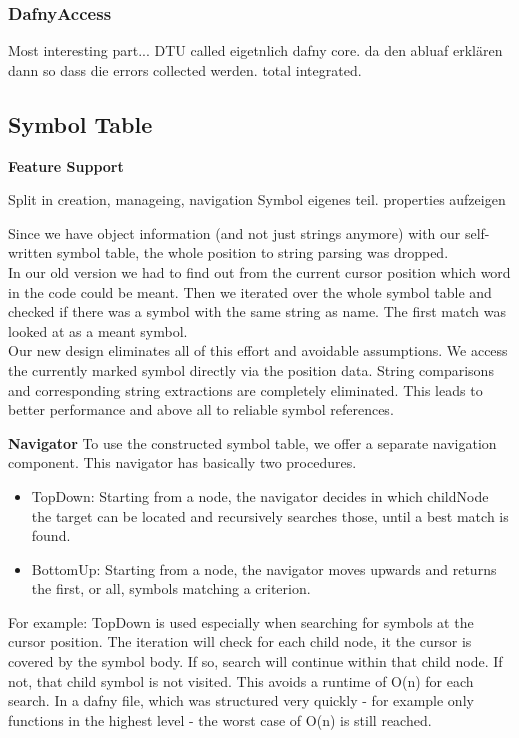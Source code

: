 \subsubsection{DafnyAccess}
Most interesting part...
DTU called eigetnlich dafny core.
da den abluaf erklären
dann so dass die errors collected werden.
total integrated.

\subsection{Symbol Table}



\textbf{Feature Support}

Split in creation, manageing, navigation
Symbol eigenes teil.
properties aufzeigen


Since we have object information (and not just strings anymore) with our self-written symbol table,
the whole position to string parsing was dropped. \\

In our old version we had to find out from the current cursor position which word in the code could be meant.
Then we iterated over the whole symbol table and checked if there was a symbol with the same string as name.
The first match was looked at as a meant symbol. \\

Our new design eliminates all of this effort and avoidable assumptions.
We access the currently marked symbol directly via the position data.
String comparisons and corresponding string extractions are completely eliminated.
This leads to better performance and above all to reliable symbol references.


\textbf{Navigator}
To use the constructed symbol table, we offer a separate navigation component.
This navigator has basically two procedures.
\begin{itemize}
\item TopDown: Starting from a node, the navigator decides in which childNode the target can be located and recursively searches those, until a best match is found.
\item BottomUp: Starting from a node, the navigator moves upwards and returns the first, or all, symbols matching a criterion.
\end{itemize}

For example: TopDown is used especially when searching for symbols at the cursor position.
The iteration will check for each child node, it the cursor is covered by the symbol body.
If so, search will continue within that child node.
If not, that child symbol is not visited.
This avoids a runtime of O(n) for each search. 
In a dafny file, which was structured very quickly - for example only functions in the highest level - the worst case of O(n) is still reached. 


